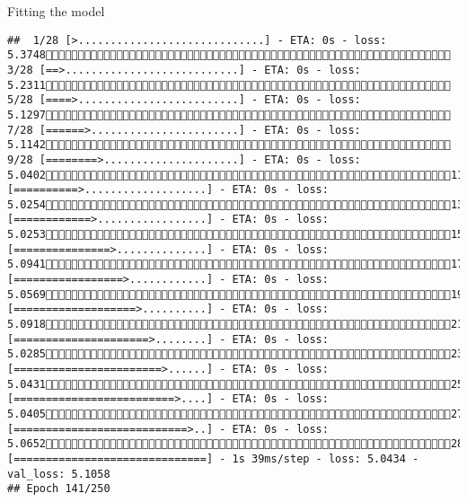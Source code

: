 \documentclass[
  ignorenonframetext,
]{beamer}
\begin{document}
\begin{frame}[fragile]{Fitting the model}
\begin{verbatim}
##  1/28 [>.............................] - ETA: 0s - loss: 5.3748 3/28 [==>...........................] - ETA: 0s - loss: 5.2311 5/28 [====>.........................] - ETA: 0s - loss: 5.1297 7/28 [======>.......................] - ETA: 0s - loss: 5.1142 9/28 [========>.....................] - ETA: 0s - loss: 5.040211/28 [==========>...................] - ETA: 0s - loss: 5.025413/28 [============>.................] - ETA: 0s - loss: 5.025315/28 [===============>..............] - ETA: 0s - loss: 5.094117/28 [=================>............] - ETA: 0s - loss: 5.056919/28 [===================>..........] - ETA: 0s - loss: 5.091821/28 [=====================>........] - ETA: 0s - loss: 5.028523/28 [=======================>......] - ETA: 0s - loss: 5.043125/28 [=========================>....] - ETA: 0s - loss: 5.040527/28 [===========================>..] - ETA: 0s - loss: 5.065228/28 [==============================] - 1s 39ms/step - loss: 5.0434 - val_loss: 5.1058
## Epoch 141/250

\end{verbatim}
\end{frame}
\end{document}
